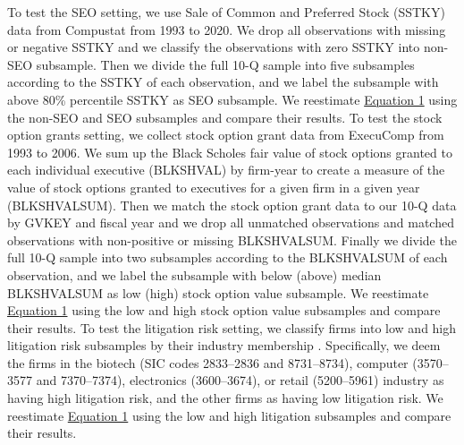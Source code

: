 \documentclass[letterpaper,11pt]{article}
\begin{document}
\begin{spacing}{1.5}
To test the SEO setting, we use Sale of Common and Preferred Stock (SSTKY) data from Compustat from 1993 to 2020. We drop all observations with missing or negative SSTKY and we classify the observations with zero SSTKY into non-SEO subsample. Then we divide the full 10-Q sample into five subsamples according to the SSTKY of each observation, and we label the subsample with above 80\% percentile SSTKY as SEO subsample. We reestimate \hyperref[eq1]{Equation 1} using the non-SEO and SEO subsamples and compare their results. To test the stock option grants setting, we collect stock option grant data from ExecuComp from 1993 to 2006. We sum up the Black Scholes fair value of stock options granted to each individual executive (BLKSHVAL) by firm-year to create a measure of the value of stock options granted to executives for a given firm in a given year (BLKSHVALSUM). Then we match the stock option grant data to our 10-Q data by GVKEY and fiscal year and we drop all unmatched observations and matched observations with non-positive or missing BLKSHVALSUM. Finally we divide the full 10-Q sample into two subsamples according to the BLKSHVALSUM of each observation, and we label the subsample with below (above) median BLKSHVALSUM as low (high) stock option value subsample. We reestimate \hyperref[eq1]{Equation 1} using the low and high stock option value subsamples and compare their results. To test the litigation risk setting, we classify firms into low and high litigation risk subsamples by their industry membership \cite{francisShareholderLitigationCorporate1994,kimMeasuringSecuritiesLitigation2012}. Specifically, we deem the firms in the biotech (SIC codes 2833–2836 and 8731–8734), computer (3570–3577 and 7370–7374), electronics (3600–3674), or retail (5200–5961) industry as having high litigation risk, and the other firms as having low litigation risk. We reestimate \hyperref[eq1]{Equation 1} using the low and high litigation subsamples and compare their results.


\end{spacing}
\end{document}
